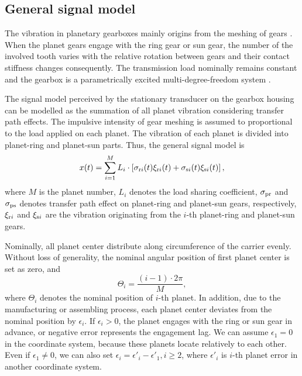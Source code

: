 \documentclass[a4paper,fleqn]{cas-sc}%
\begin{document}
\subsection{General signal model}
\par The vibration in planetary gearboxes mainly origins from the meshing of gears \cite{Velex1996}. When the planet gears engage with the ring gear or sun gear, the number of the involved tooth varies with the relative rotation between gears and their contact stiffness changes consequently. The transmission load nominally remains constant and the gearbox is a parametrically excited multi-degree-freedom system \cite{Acar2019}. 
\par The signal model perceived by the stationary transducer on the gearbox housing can be modelled as the summation of all planet vibration considering transfer path effects. The impulsive intensity of gear meshing is assumed to proportional to the load applied on each planet. The vibration of each planet is divided into planet-ring and planet-sun parts. Thus, the general signal model is
\begin{equation}
    x(t)=\sum_{i=1}^{M} L_i \cdot \left[ \sigma_{{\rm r}i}(t) \xi_{{\rm r}i}(t) + \sigma_{{\rm s}i}(t) \xi_{{\rm s}i}(t) \right], \label{eq:general_signal}
\end{equation}
where $M$ is the planet number, $L_i$ denotes the load sharing coefficient, $\sigma_{\rm pr}$ and $\sigma_{\rm ps}$ denotes transfer path effect on planet-ring and planet-sun gears, respectively, $\xi_{{\rm r}i}$ and $\xi_{{\rm s}i}$ are the vibration originating from the $i$-th planet-ring and planet-sun gears.
\par Nominally, all planet center distribute along circumference of the carrier evenly. Without loss of generality, the nominal angular position of first planet center is set as zero, and
\begin{equation}
    \Theta_i=\frac{(i-1)\cdot 2\pi}{M},
\end{equation}
where $\Theta_i$ denotes the nominal position of $i$-th planet. In addition, due to the manufacturing or assembling process, each planet center deviates from the nominal position by $\epsilon_i$. If $\epsilon_i>0$, the planet engages with the ring or sun gear in advance, or negative error represents the engagement lag. We can assume $\epsilon_1=0$ in the coordinate system, because these planets locate relatively to each other. Even if $\epsilon_1 \neq 0$, we can also set $\epsilon_i=\epsilon'_i-\epsilon'_1,i \geq 2$, where $\epsilon'_i$ is $i$-th planet error in another coordinate system.
\end{document}
